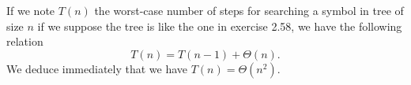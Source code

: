 \documentclass[a4paper,12pt]{article}
\begin{document}
If we note $T(n)$ the worst-case number of steps for searching a
symbol in tree of size $n$ if we suppose the tree is like the one in
exercise 2.58, we have the following relation
\[ T(n) = T(n-1) + \Theta(n).\]
We deduce immediately that we have $T(n) = \Theta(n^2)$.
\end{document}
